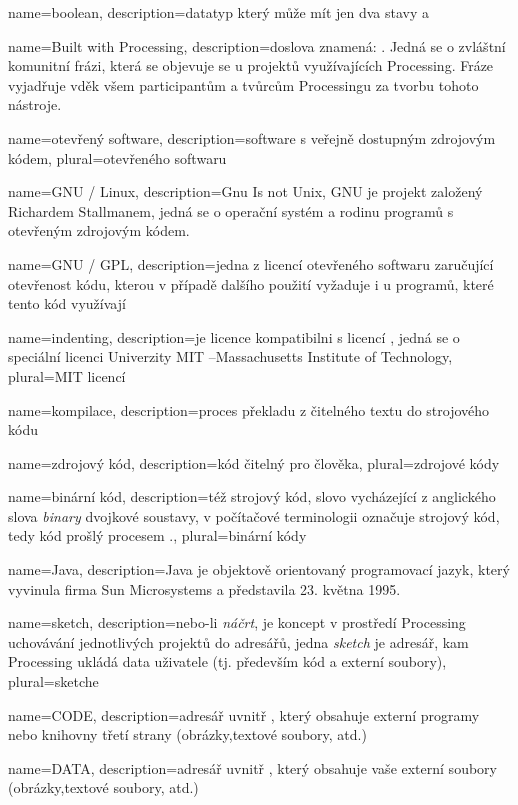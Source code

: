 {
  name={boolean},
  description={datatyp který může mít jen dva stavy  a }
}

{
	name={Built with Processing},
	description={doslova znamená: . Jedná se o zvláštní komunitní frázi, která se objevuje se u projektů využívajících Processing. Fráze vyjadřuje vděk všem participantům a tvůrcům Processingu za tvorbu tohoto nástroje.}
}

{
  name={otevřený software},
  description={software s veřejně dostupným zdrojovým kódem},
  plural={otevřeného softwaru}
}

{
  name={GNU / Linux},
  description={Gnu Is not Unix, GNU je projekt založený Richardem Stallmanem, jedná se o operační systém a rodinu programů s otevřeným zdrojovým kódem.}
}

{
  name={GNU / GPL},
  description={jedna z licencí otevřeného softwaru zaručující otevřenost kódu, kterou v případě dalšího použití vyžaduje i u programů, které tento kód využívají}
}

{
  name={indenting},
  description={je licence kompatibilni s licencí , jedná se o speciální licenci Univerzity MIT --Massachusetts Institute of Technology},
  plural={MIT licencí}
}


{
	name={kompilace},
	description={proces překladu z čitelného textu do strojového kódu}
}

{
	name={zdrojový kód},
	description={kód čitelný pro člověka},
	plural={zdrojové kódy}
}

{
	name={binární kód},
	description={též strojový kód, slovo vycházející z anglického slova {\em binary} dvojkové soustavy, v počítačové terminologii označuje strojový kód, tedy kód prošlý procesem .},
	plural={binární kódy}
}

{
	name={Java},
	description={Java je objektově orientovaný programovací jazyk, který vyvinula firma Sun Microsystems a představila 23. května 1995.}
}

{
	name={sketch},
	description={nebo-li {\em náčrt}, je koncept v prostředí Processing uchovávání jednotlivých projektů do adresářů, jedna {\em sketch} je adresář, kam Processing ukládá data uživatele (tj. především kód a externí soubory)},
	plural={sketche}
}

{
	name={CODE},
	description={adresář uvnitř , který obsahuje externí   programy nebo knihovny třetí strany (obrázky,textové soubory, atd.)}
}

{
	name={DATA},
	description={adresář uvnitř , který obsahuje vaše externí soubory (obrázky,textové soubory, atd.)}
}
